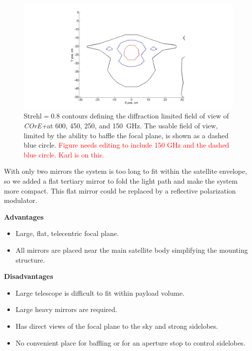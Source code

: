 \documentclass[11pt,a4paper]{article}
\newcommand{\comred}[1]{\textcolor{red}{#1}}
\newcommand{\coreplus}{\textit{\negthinspace COrE+\/}}
\begin{document}
\begin{figure}[htbp] %
	\centering
	\includegraphics[width=12cm]{strehl_250_450_600.jpg} 
	\caption{Strehl$=0.8$ contours defining the diffraction limited field of view of \coreplus at 600, 450, 250, and 150~GHz. 
		The usable field of view, limited by the ability to baffle the focal plane, is shown as a dashed blue circle.
		\comred{Figure needs editing to include 150 GHz and the dashed blue circle.  Karl is on this.} 
	}
	\label{fig:strehl_xdragone}
\end{figure}

With only two mirrors the system is too long to fit within the satellite envelope, so we added a flat 
tertiary mirror to fold the light path and make the system more compact.  This flat mirror 
could be replaced by a reflective polarization modulator. 


\noindent \textbf{Advantages}
\begin{itemize}
	\item Large, flat, telecentric focal plane.
	\item All mirrors are placed near the main satellite body simplifying the mounting structure.
\end{itemize}

\noindent \textbf{Disadvantages}
\begin{itemize}
	\item Large telescope is difficult to fit within payload volume.
	\item Large heavy mirrors are required.
	\item Has direct views of the focal plane to the sky and strong sidelobes.
	\item No convenient place for baffling or for an aperture stop to control sidelobes.
\end{itemize}
\end{document}
